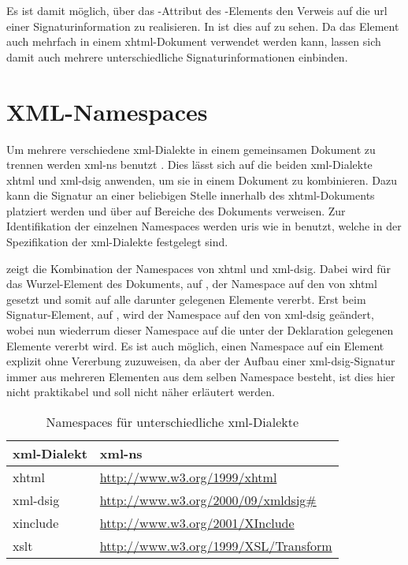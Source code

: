 Es ist damit möglich, über das -Attribut des -Elements den Verweis auf die \gls{url} einer Signaturinformation zu realisieren. In
 ist dies auf  zu sehen. Da das
Element auch mehrfach in einem \gls{xhtml}-Dokument verwendet werden kann, lassen sich damit auch mehrere unterschiedliche Signaturinformationen einbinden.



\section{XML-Namespaces}
\label{sec:Signaturbindung:XML-NS}
Um mehrere verschiedene \gls{xml}-Dialekte in einem gemeinsamen Dokument zu trennen werden \gls{xml-ns} benutzt \cite{xml-ns:w3c}. Dies lässt sich auf die
beiden \gls{xml}-Dialekte \gls{xhtml} und \gls{xml-dsig} anwenden, um sie in einem Dokument zu kombinieren. Dazu kann die Signatur an einer beliebigen Stelle
innerhalb des \gls{xhtml}-Dokuments platziert werden und über  auf Bereiche des Dokuments verweisen. Zur Identifikation der einzelnen
Namespaces werden \glspl{uri} wie in  benutzt, welche in der Spezifikation der \gls{xml}-Dialekte festgelegt sind. 

 zeigt die Kombination der Namespaces von \gls{xhtml} und \gls{xml-dsig}. Dabei wird für das Wurzel-Element des Dokuments,  auf
, der Namespace auf den von \gls{xhtml} gesetzt und somit auf alle darunter gelegenen Elemente vererbt. Erst beim Signatur-Element,
 auf , wird der Namespace auf den von \gls{xml-dsig} geändert, wobei nun wiederrum dieser Namespace auf die unter
der Deklaration gelegenen Elemente vererbt wird. Es ist auch möglich, einen Namespace auf ein Element explizit ohne Vererbung zuzuweisen, da aber der Aufbau
einer \gls{xml-dsig}-Signatur immer aus mehreren Elementen aus dem selben Namespace besteht, ist dies hier nicht praktikabel und soll nicht näher erläutert
werden.

\begin{table}
    \centering
    \begin{tabularx}{\textwidth}{ l X }
        \gls{xml}-Dialekt  & \gls{xml-ns} \\
        \hline
        \hline
        \gls{xhtml} & \url{http://www.w3.org/1999/xhtml} \\
        \hline
        \gls{xml-dsig} & \url{http://www.w3.org/2000/09/xmldsig\#} \\
        \hline
        \gls{xinclude} & \url{http://www.w3.org/2001/XInclude} \\
        \hline
        \gls{xslt} & \url{http://www.w3.org/1999/XSL/Transform} \\
        \hline
    \end{tabularx}
    \caption{Namespaces für unterschiedliche \protect\gls{xml}-Dialekte}
    \label{tab:xml-namespaces}
\end{table}

